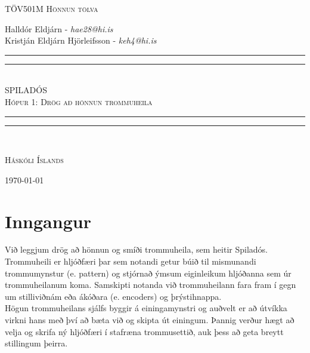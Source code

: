 \documentclass[a4paper,11pt,twocolumn]{article}
\begin{document}
	
	
	\newcommand*{\titleGP}{\begingroup %
	\centering %
    \begin{flushleft}
    \textsc{TÖV501M Hönnun tölva}
    
    \noindent
    \small
    Halldór Eldjárn - \emph{hae28@hi.is}\\
	Kristján Eldjárn Hjörleifsson - \emph{keh4@hi.is}
	\end{flushleft}
	\vspace*{\baselineskip} %

	\rule{\textwidth}{1.6pt}\vspace*{-\baselineskip}\vspace*{2pt} %
	\rule{\textwidth}{0.4pt}\\[\baselineskip] %

	{\LARGE SPILADÓS}\\	[0.2\baselineskip] %
	\textsc{Hópur 1: Drög að hönnun trommuheila} 
	\rule{\textwidth}{0.4pt}\vspace*{-\baselineskip}\vspace{3.2pt} %
	\rule{\textwidth}{1.6pt}\\[\baselineskip] %
	\vspace*{3\baselineskip} 
	\scshape %
	
	
	\vspace*{3\baselineskip} 
	{\textsc{Háskóli Íslands}\par}
	
	\large\textsc{\today}

	\vspace*{3\baselineskip}


	\endgroup}

	\begin{titlepage}
		\titleGP
	\end{titlepage}


\tableofcontents
\listoffigures
\listoftables
\cleardoublepage
{}

\section{Inngangur}
Við leggjum drög að hönnun og smíði trommuheila, sem heitir Spiladós. Trommuheili er hljóðfæri þar sem notandi getur búið til mismunandi trommu\-mynstur (e. pattern) og stjórnað ýmsum eiginleikum hljóðanna sem úr trommuheilanum koma. Samskipti notanda við trommuheilann fara fram í gegn um stilliviðnám eða ákóðara (e. encoders) og þrýstihnappa.\\
\indent Högun trommuheilans sjálfs byggir á einingamynstri og auðvelt er að útvíkka virkni hans með því að bæta við og skipta út einingum. Þannig verður hægt að velja og skrifa ný hljóðfæri í stafræna trommusettið, auk þess að geta breytt stillingum þeirra.
\end{document}
